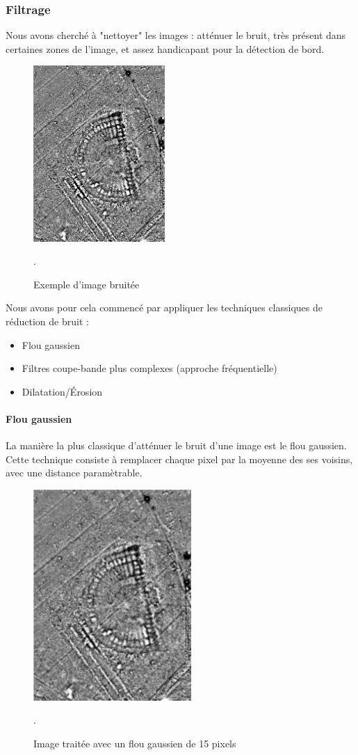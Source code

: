 \documentclass[a4paper, 12pt, titlepage, oneside, french]{article}
\begin{document}
	\subsubsection{Filtrage}
	Nous avons cherché à "nettoyer" les images : atténuer le bruit, très présent dans certaines zones de l'image, et assez handicapant pour la détection de bord.
	\begin{figure}[H]
		\centering
		\includegraphics[width=5cm]{filter_input.png}
		\caption{Exemple d'image bruitée}. 
		\label{fig:FilterInput}
	\end{figure}
	\pagebreak
	Nous avons pour cela commencé par appliquer les techniques classiques de réduction de bruit : 
	\begin{itemize}
		\item Flou gaussien
		\item Filtres coupe-bande plus complexes (approche fréquentielle)
		\item Dilatation/Érosion
	\end{itemize}
	\paragraph{\textbf{Flou gaussien}}
	La manière la plus classique d'atténuer le bruit d'une image est le flou gaussien. Cette technique consiste à remplacer chaque pixel par la moyenne des ses voisins, avec une distance paramètrable.
	\begin{figure}[H]
		\centering
		\includegraphics[width=6cm]{filter_gaussian.png}
		\caption{Image traitée avec un flou gaussien de 15 pixels}. 
		\label{fig:FilterGaussian}
	\end{figure}
\end{document}
